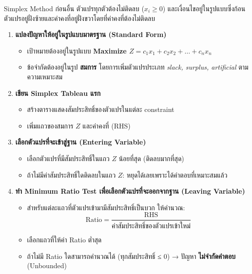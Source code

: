 \begin{algorithm}
    {Simplex Method}{}
    ก่อนอื่น ตัวแปรทุกตัวต้องไม่ติดลบ ($x_i \geq 0$) และเงื่อนไขอยู่ในรูปแบบซึ่งก้อนตัวแปรอยู่ฝั่งซ้ายและค่าคงที่อยู่ฝั่งขวาโดยที่ค่าคงที่ต้องไม่ติดลบ
    \begin{enumerate}[label=\textbf{ขั้นที่ \arabic*.}, align=left, labelwidth=5em, labelsep=1em, leftmargin=*, itemsep=0pt, topsep=0pt, parsep=0pt, partopsep=0pt]
 
  \item \textbf{แปลงปัญหาให้อยู่ในรูปแบบมาตรฐาน (Standard Form)}  
  \begin{itemize}[itemsep=0pt, topsep=0pt, parsep=0pt, partopsep=0pt]
    \item เป้าหมายต้องอยู่ในรูปแบบ \textbf{Maximize $Z = c_1x_1 + c_2x_2 + \dots + c_nx_n$}
    \item ข้อจำกัดต้องอยู่ในรูป \textbf{สมการ} โดยการเพิ่มตัวแปรประเภท \textit{slack, surplus, artificial} ตามความเหมาะสม
  \end{itemize}

  \item \textbf{เขียน Simplex Tableau แรก}  
  \begin{itemize}[itemsep=0pt, topsep=0pt, parsep=0pt, partopsep=0pt]
    \item สร้างตารางแสดงสัมประสิทธิ์ของตัวแปรในแต่ละ constraint
    \item เพิ่มแถวของสมการ $Z$ และค่าคงที่ (RHS)
  \end{itemize}

  \item \textbf{เลือกตัวแปรที่จะเข้าสู่ฐาน (Entering Variable)}  
  \begin{itemize}[itemsep=0pt, topsep=0pt, parsep=0pt, partopsep=0pt]
    \item เลือกตัวแปรที่มีสัมประสิทธิ์ในแถว $Z$ น้อยที่สุด (ติดลบมากที่สุด)
    \item ถ้าไม่มีค่าสัมประสิทธิ์ใดติดลบในแถว $Z$: หยุดได้เลยเพราะได้คำตอบที่เหมาะสมแล้ว
  \end{itemize}

  \item \textbf{ทำ Minimum Ratio Test เพื่อเลือกตัวแปรที่จะออกจากฐาน (Leaving Variable)}  
  \begin{itemize}[itemsep=0pt, topsep=0pt, parsep=0pt, partopsep=0pt]
    \item สำหรับแต่ละแถวที่ตัวแปรเข้ามามีสัมประสิทธิ์เป็นบวก ให้คำนวณ:
    \[
    \text{Ratio} = \frac{\text{RHS}}{\text{ค่าสัมประสิทธิ์ของตัวแปรเข้าใหม่}}
    \]
    \item เลือกแถวที่ให้ค่า Ratio ต่ำสุด
    \item ถ้าไม่มี Ratio ใดสามารถคำนวณได้ (ทุกสัมประสิทธิ์ ≤ 0) → ปัญหา \textbf{ไม่จำกัดคำตอบ} (Unbounded)
  \end{itemize}


\end{enumerate}
\end{algorithm}
